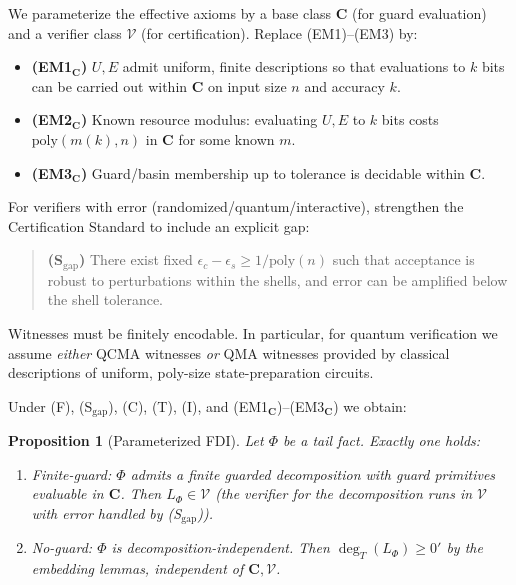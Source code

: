 \documentclass[12pt]{article}
\theoremstyle{definition}
\theoremstyle{plain}
\newtheorem{proposition}{Proposition}[section]
\begin{document}
We parameterize the effective axioms by a base class $\mathbf C$ (for guard evaluation) and a verifier class $\mathcal V$ (for certification). Replace \textup{(EM1)}–\textup{(EM3)} by:

\begin{itemize}
  \item \textbf{(EM1$_{\mathbf C}$)} $U,E$ admit uniform, finite descriptions so that evaluations to $k$ bits can be carried out within $\mathbf C$ on input size $n$ and accuracy $k$.
  \item \textbf{(EM2$_{\mathbf C}$)} Known resource modulus: evaluating $U,E$ to $k$ bits costs $\mathrm{poly}(m(k),n)$ in $\mathbf C$ for some known $m$.
  \item \textbf{(EM3$_{\mathbf C}$)} Guard/basin membership up to tolerance is decidable within $\mathbf C$.
\end{itemize}

For verifiers with error (randomized/quantum/interactive), strengthen the Certification Standard to include an explicit gap:

\begin{quote}
\textbf{(S$_{\mathrm{gap}}$)} There exist fixed $\epsilon_c-\epsilon_s \ge 1/\mathrm{poly}(n)$ such that acceptance is robust to perturbations within the shells, and error can be amplified below the shell tolerance.
\end{quote}

Witnesses must be finitely encodable. In particular, for quantum verification we assume \emph{either} QCMA witnesses \emph{or} QMA witnesses provided by classical descriptions of uniform, poly-size state-preparation circuits.

Under \textup{(F)}, \textup{(S$_{\mathrm{gap}}$)}, \textup{(C)}, \textup{(T)}, \textup{(I)}, and \textup{(EM1$_{\mathbf C}$)}–\textup{(EM3$_{\mathbf C}$)} we obtain:

\begin{proposition}[Parameterized FDI]\label{prop:param-fdi}
Let $\Phi$ be a tail fact. Exactly one holds:
\begin{enumerate}
  \item \emph{Finite-guard:} $\Phi$ admits a finite guarded decomposition with guard primitives evaluable in $\mathbf C$. Then $L_\Phi\in\mathcal V$ (the verifier for the decomposition runs in $\mathcal V$ with error handled by \textup{(S$_{\mathrm{gap}}$)}).
  \item \emph{No-guard:} $\Phi$ is decomposition-independent. Then $\deg_T(L_\Phi)\ge 0'$ by the embedding lemmas, independent of $\mathbf C,\mathcal V$.
\end{enumerate}
\end{proposition}
\end{document}
